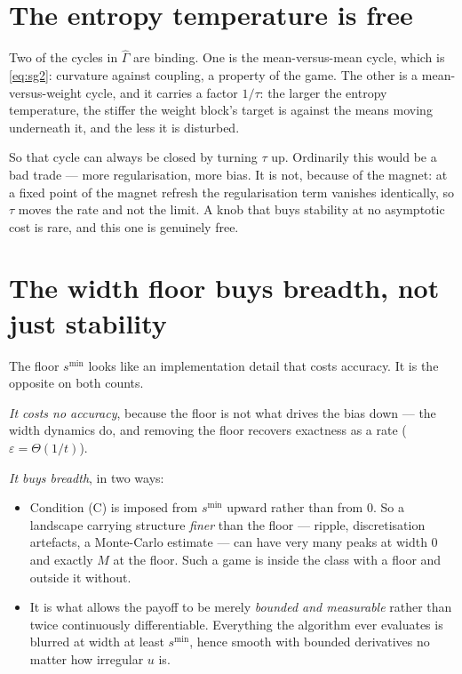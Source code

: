 \documentclass[11pt]{article}
\theoremstyle{definition}
\begin{document}
\section{The entropy temperature is free}

Two of the cycles in $\hat\Gamma$ are binding. One is the mean-versus-mean cycle,
which is \eqref{eq:sg2}: curvature against coupling, a property of the game. The
other is a mean-versus-weight cycle, and it carries a factor $1/\tau$: the larger
the entropy temperature, the stiffer the weight block's target is against the
means moving underneath it, and the less it is disturbed.

So that cycle can always be closed by turning $\tau$ up. Ordinarily this would be
a bad trade --- more regularisation, more bias. It is not, because of the magnet:
at a fixed point of the magnet refresh the regularisation term vanishes
identically, so $\tau$ moves the rate and not the limit. A knob that buys
stability at no asymptotic cost is rare, and this one is genuinely free.

\section{The width floor buys breadth, not just stability}

The floor $s^{\min}$ looks like an implementation detail that costs accuracy. It
is the opposite on both counts.

\emph{It costs no accuracy}, because the floor is not what drives the bias down
--- the width dynamics do, and removing the floor recovers exactness as a rate
($\varepsilon = \Theta(1/t)$).

\emph{It buys breadth}, in two ways:
\begin{itemize}[leftmargin=1.4em, itemsep=2pt]
\item Condition (C) is imposed from $s^{\min}$ upward rather than from $0$. So a
  landscape carrying structure \emph{finer} than the floor --- ripple,
  discretisation artefacts, a Monte-Carlo estimate --- can have very many peaks at
  width $0$ and exactly $M$ at the floor. Such a game is inside the class with a
  floor and outside it without.
\item It is what allows the payoff to be merely \emph{bounded and measurable}
  rather than twice continuously differentiable. Everything the algorithm ever
  evaluates is blurred at width at least $s^{\min}$, hence smooth with bounded
  derivatives no matter how irregular $u$ is.
\end{itemize}
\end{document}
